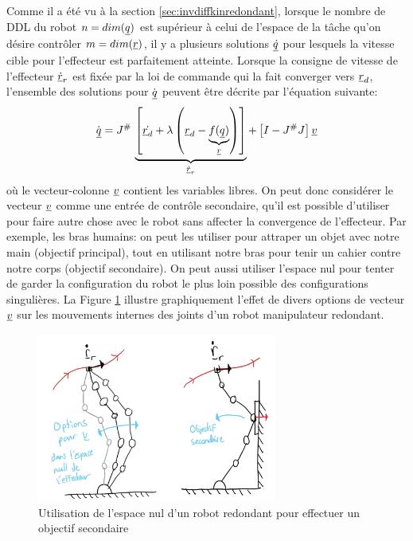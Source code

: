 Comme il a été vu à la section \ref{sec:invdiffkinredondant}, lorsque le nombre de DDL du robot $n = dim(\underline{q})$  est supérieur à celui de l'espace de la tâche qu'on désire contrôler $m = dim(\underline{r})$, il y a plusieurs solutions $\underline{\dot{q}}$ pour lesquels la vitesse cible pour l'effecteur est parfaitement atteinte. Lorsque la consigne de vitesse de l'effecteur $\underline{\dot{r}}_r$ est fixée par la loi de commande qui la fait converger vers $\underline{r}_d$,  l'ensemble des solutions pour $\dot{\underline{q}}$ peuvent être décrite par l'équation suivante:
\begin{align}
\dot{\underline{q}} = J^{\#} \, 
\underbrace{
\left[ \dot{\underline{r}_d} + \lambda \left( \underline{r}_d  - \underbrace{f(\underline{q})}_{\underline{r}}  \right)\right] 
}_{\underline{\dot{r}}_r}
+ \left[ I - J^{\#}J  \right] \underline{v}
\end{align}
où le vecteur-colonne $\underline{v}$ contient les variables libres. On peut donc considérer le vecteur $\underline{v}$ comme une entrée de contrôle secondaire, qu'il est possible d'utiliser pour faire autre chose avec le robot sans affecter la convergence de l'effecteur. Par exemple, les bras humains: on peut les utiliser pour attraper un objet avec notre main (objectif principal), tout en utilisant notre bras pour tenir un cahier contre notre corps (objectif secondaire). On peut aussi utiliser l'espace nul pour tenter de garder la configuration du robot le plus loin possible des configurations singulières. La Figure \ref{fig:nullspacecontrol} illustre graphiquement l'effet de divers options de vecteur $\underline{v}$ sur les mouvements internes des joints d'un robot manipulateur redondant. 

\begin{figure}[H]
	\centering
		\includegraphics[width=0.70\textwidth]{fig/nullspacecontrol.jpg}
	\caption{Utilisation de l'espace nul d'un robot redondant pour effectuer un objectif secondaire}
	\label{fig:nullspacecontrol}
\end{figure}


